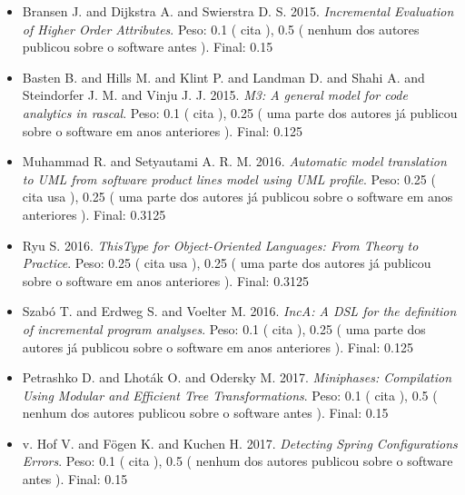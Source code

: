 \begin{itemize}
\item Bransen J. and Dijkstra A. and Swierstra D. S.
      2015.
        \textit{ Incremental Evaluation of Higher Order Attributes}.
      Peso:
      0.1 (
          cita
      ),
      0.5 (
nenhum dos autores publicou sobre o software antes
      ).
      Final:
      0.15

\item Basten B. and Hills M. and Klint P. and Landman D. and Shahi A. and Steindorfer J. M. and Vinju J. J.
      2015.
        \textit{ M3: A general model for code analytics in rascal}.
      Peso:
      0.1 (
          cita
      ),
      0.25 (
uma parte dos autores já publicou sobre o software em anos anteriores
      ).
      Final:
      0.125

\item Muhammad R. and Setyautami A. R. M.
      2016.
        \textit{ Automatic model translation to UML from software product lines model using UML profile}.
      Peso:
      0.25 (
          cita
          usa
      ),
      0.25 (
uma parte dos autores já publicou sobre o software em anos anteriores
      ).
      Final:
      0.3125

\item Ryu S.
      2016.
        \textit{ ThisType for Object-Oriented Languages: From Theory to Practice}.
      Peso:
      0.25 (
          cita
          usa
      ),
      0.25 (
uma parte dos autores já publicou sobre o software em anos anteriores
      ).
      Final:
      0.3125

\item Szabó T. and Erdweg S. and Voelter M.
      2016.
        \textit{ IncA: A DSL for the definition of incremental program analyses}.
      Peso:
      0.1 (
          cita
      ),
      0.25 (
uma parte dos autores já publicou sobre o software em anos anteriores
      ).
      Final:
      0.125

\item Petrashko D. and Lhot\'{a}k O. and Odersky M.
      2017.
        \textit{ Miniphases: Compilation Using Modular and Efficient Tree Transformations}.
      Peso:
      0.1 (
          cita
      ),
      0.5 (
nenhum dos autores publicou sobre o software antes
      ).
      Final:
      0.15

\item v. Hof V. and F\"{o}gen K. and Kuchen H.
      2017.
        \textit{ Detecting Spring Configurations Errors}.
      Peso:
      0.1 (
          cita
      ),
      0.5 (
nenhum dos autores publicou sobre o software antes
      ).
      Final:
      0.15

\end{itemize}

